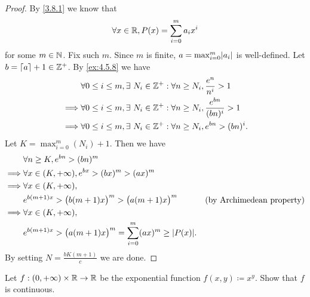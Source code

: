\begin{proof}
  By \cref{3.8.1} we know that
  \[
    \forall x \in \mathbb{R}, P(x) = \sum_{i = 0}^m a_i x^i
  \]
  for some \(m \in \mathbb{N}\).
  Fix such \(m\).
  Since \(m\) is finite, \(a = \max_{i = 0}^m \abs{a_i}\) is well-defined.
  Let \(b = \left\lceil a\right\rceil + 1 \in \mathbb{Z}^+\).
  By \cref{ex:4.5.8} we have
  \begin{align*}
             & \forall 0 \leq i \leq m, \exists\ N_i \in \mathbb{Z}^+ : \forall n \geq N_i, \frac{e^n}{n^i} > 1       \\
    \implies & \forall 0 \leq i \leq m, \exists\ N_i \in \mathbb{Z}^+ : \forall n \geq N_i, \frac{e^{bn}}{(bn)^i} > 1 \\
    \implies & \forall 0 \leq i \leq m, \exists\ N_i \in \mathbb{Z}^+ : \forall n \geq N_i, e^{bn} > (bn)^i.
  \end{align*}
  Let \(K = \max_{i = 0}^m(N_i) + 1\).
  Then we have
  \begin{align*}
             & \forall n \geq K, e^{bn} > (bn)^m                                                                                     \\
    \implies & \forall x \in (K, +\infty), e^{bx} > (bx)^m > (ax)^m                                                                  \\
    \implies & \forall x \in (K, +\infty),                                                                                           \\
             & e^{b (m + 1) x} > \big(b (m + 1) x\big)^m > \big(a (m + 1) x\big)^m                & \text{(by Archimedean property)} \\
    \implies & \forall x \in (K, +\infty),                                                                                           \\
             & e^{b (m + 1) x} > \big(a (m + 1) x\big)^m = \sum_{i = 0}^m (ax)^m \geq \abs{P(x)}.
  \end{align*}
  By setting \(N = \frac{b K (m + 1)}{c}\) we are done.
\end{proof}

\begin{ex}\label{ex:4.5.10}
  Let \(f : (0, +\infty) \times \mathbb{R} \to \mathbb{R}\) be the exponential function \(f(x, y) \coloneqq x^y\).
  Show that \(f\) is continuous.
\end{ex}

